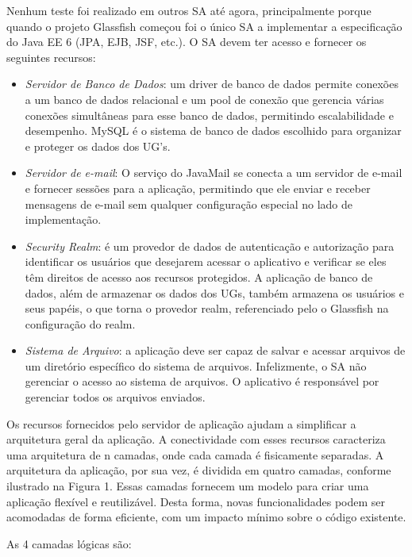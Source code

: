 \documentclass[envcountsame,envcountchap]{svmono}
\begin{document}
Nenhum teste foi realizado em outros SA até agora, principalmente porque quando o projeto Glassfish começou foi o único SA a implementar a especificação do Java EE 6 (JPA, EJB, JSF, etc.). O SA devem ter acesso e fornecer os seguintes recursos:

\begin{itemize}
\item \textit{Servidor de Banco de Dados}: um driver de banco de dados permite conexões a um banco de dados relacional e um pool de conexão que gerencia várias conexões simultâneas para esse banco de dados, permitindo escalabilidade e desempenho. MySQL é o sistema de banco de dados escolhido para organizar e proteger os dados dos UG's.

\item \textit{Servidor de e-mail}: O serviço do JavaMail se conecta a um servidor de e-mail e fornecer sessões para a aplicação, permitindo que ele enviar e receber mensagens de e-mail sem qualquer configuração especial no lado de implementação.

\item \textit{Security Realm}: é um provedor de dados de autenticação e autorização para identificar os usuários que desejarem acessar o aplicativo e verificar se eles têm direitos de acesso aos recursos protegidos. A aplicação de banco de dados, além de armazenar os dados dos UGs, também armazena os usuários e seus papéis, o que torna o provedor realm, referenciado pelo o Glassfish na configuração do realm.

\item \textit{Sistema de Arquivo}: a aplicação deve ser capaz de salvar e acessar arquivos de um diretório específico do sistema de arquivos. Infelizmente, o SA não gerenciar o acesso ao sistema de arquivos. O aplicativo é responsável por gerenciar todos os arquivos enviados.
\end{itemize}

Os recursos fornecidos pelo servidor de aplicação ajudam a simplificar a arquitetura geral da aplicação. A conectividade com esses recursos caracteriza uma arquitetura de n camadas, onde cada camada é fisicamente separadas. A arquitetura da aplicação, por sua vez, é dividida em quatro camadas, conforme ilustrado na Figura 1. Essas camadas fornecem um modelo para criar uma aplicação flexível e reutilizável. Desta forma, novas funcionalidades podem ser acomodadas de forma eficiente, com um impacto mínimo sobre o código existente.

As 4 camadas lógicas são:
\end{document}
